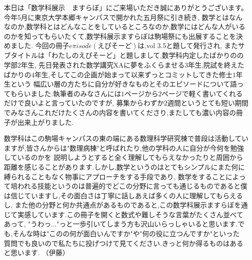 本日は「数学科展示　ますらぼ」にご来場いただき誠にありがとうございます。今年5月に東京大学本郷キャンパスで開かれた五月祭に引き続き,
数学とはなんなのか,数学科とはどんなことをしているところなのか,数学にはどんな人がいるのかを知ってもらいたくて,数学科展示ますらぼは駒場祭にも出展することを決めました.
今回の冊子$e\pi isode$$(えぴそーど)$は,vol 3.5と題して発行され, またサブタイトルは「わたしのえぴそーど」と題しまして,数学科内定したばかりのの学部$2$年生,
先日発表された数学講究XAに夢をふくらませる$3$年生,院試を終えたばかりの$4$年生,そしてこの企画が始まって以来ずっとコミットしてきた修士$1$年生という
幅広い層の方たちに自分が好きなものとそのエピソードについて語ってもらいました.執筆者のみなさんには$1$ページから$2$ページで軽く書いてくれるだけで良いよと言っていたのですが,
募集からわずか$2$週間というとても短い期間でみなさんこれだけたくさんの内容を書いてくださり,またしても濃い内容の冊子が出来上がりました.\par
数学科はこの駒場キャンパスの東の端にある数理科学研究棟で普段は活動していますが,皆さんからは"数理病棟"と呼ばれたり,他の学科の人に自分が今何を勉強しているのかを
説明しようとすると全く理解してもらえなかったりと周囲から距離を感じることがあります.しかし,数学というのはとてもシンプルにまた何に縛られることもなく物事にアプローチをする手段であり,
数学をすることによって培われる技能というのは普遍的でどこの分野に言っても通じるものであると僕は信じていますし,その面白さは丁寧に話しあえば多くの人に理解してもらえるし,
また他の分野と何か共通点があるものであると,この数学科展示ますらぼを通じて実感しています.この冊子を開くと数式や難しそうな言葉がたくさん並べてあって,
"うわっ..."っと一歩引いてしまう方も沢山いらっしゃいると思います.でも,そんな時は"このの何が面白いんですか"や"何の役に立つんですか"といった
質問でも良いので私たちに投げつけて見てください.きっと何か得るものはあると思います.
（伊藤）
